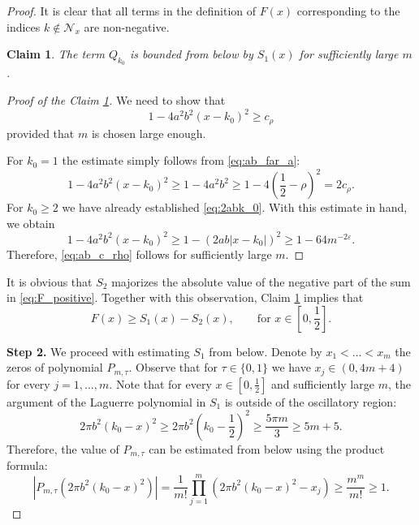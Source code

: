 \documentclass[11pt]{amsart}
\numberwithin{equation}{section}
\newtheorem{claim}[theorem]{Claim}
\begin{document}
\begin{proof}
It is clear that all terms in the definition of $F(x)$ corresponding to the indices $k\notin\mathcal{N}_x$ are non-negative.

\begin{claim}\label{claim:k_0_claim}
    The term $Q_{k_0}$ is bounded from below by $S_1(x)$ for sufficiently large $m$.
\end{claim}
\begin{proof}[Proof of the Claim \ref{claim:k_0_claim}]
We need to show that
\begin{equation}\label{eq:ab_c_rho}
1-4a^2b^2 (x-k_0)^2 \geq c_{\rho}    
\end{equation}
provided that $m$ is chosen large enough.

For $k_0=1$ the estimate simply follows from \eqref{eq:ab_far_a}:
$$
1-4a^2b^2(x-k_0)^2 \geq 1 - 4 a^2 b^2 \geq 1-4\left(\frac{1}{2} - \rho\right)^2 = 2 c_{\rho}. 
$$
For $k_0 \geq 2$ we have already established \eqref{eq:2abk_0}.
With this estimate in hand, we obtain
$$
1-4a^2b^2(x-k_0)^2 \geq 1 - (2 a b |x-k_0|)^2 \geq 1-64m^{-2\varepsilon}. 
$$
Therefore, \eqref{eq:ab_c_rho} follows for sufficiently large $m$.
\end{proof}

It is obvious that $S_2$ majorizes the absolute value of the negative part of the sum in \eqref{eq:F_positive}.
Together with this observation, Claim \ref{claim:k_0_claim} implies that 
\begin{equation}\label{eq:F_S1_S2}
    F(x)\geq S_1(x)-S_2(x), \qquad\text{for } x\in\left[0,\frac{1}{2}\right].
\end{equation}

\textbf{Step 2.} We proceed with estimating $S_1$ from below. 
Denote by $x_1 < \dots < x_m$ the zeros of polynomial $P_{m,\tau}$.
Observe that for $\tau \in \{0,1\}$ we have  $x_j \in (0,4m+4)$ for every $j=1,\dots,m.$ 
Note that for every $x\in [0,\frac{1}{2}]$ and sufficiently large $m$, the argument of the Laguerre polynomial in $S_1$ is outside of the oscillatory region:
\begin{equation}
   2\pi b^2 (k_0-x)^2 \geq 2\pi b^2 \left(k_0- \frac{1}{2}\right)^2 \geq \frac{5\pi m}{3} \geq 5m + 5. 
\end{equation}
Therefore, the value of $P_{m,\tau}$ can be estimated from below  using the product formula:
\begin{equation}\label{eq:Lm_lower_bound}
    |P_{m,\tau}(2\pi b^2 (k_0-x)^2)|=\frac{1}{m!}\prod\limits_{j=1}^m(2\pi b^2 (k_0-x)^2 - x_j) \geq \frac{m^m}{m!}\geq 1.
\end{equation}


\end{proof}
\end{document}
